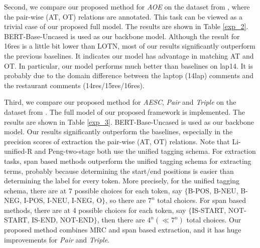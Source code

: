 \documentclass[letterpaper]{article} \usepackage{aaai21}  \usepackage{times}  \usepackage{helvet} \usepackage{courier}  \usepackage[hyphens]{url}  \usepackage{graphicx} \urlstyle{rm} \def\UrlFont{\rm}  \usepackage{natbib}  \usepackage{caption}
\begin{document}
Second, we compare our proposed method for \emph{AOE} on the dataset from \cite{fan2019target}, where the pair-wise (AT, OT) relations are annotated. 
This task can be viewed as a trivial case of our proposed full model. The results are shown in Table \ref{exp_2}. 
BERT-Base-Uncased is used as our backbone model. 
Although  the result for 16res is a little bit lower than LOTN, most of our results significantly outperform the previous baselines. 
It indicates our model has advantage in matching AT and OT. In particular, our model performs much better than baselines on lap14. It is probably due to 
the domain difference between the laptop (14lap) comments and the restaurant comments (14res/15res/16res). 

Third, we compare our proposed method for \emph{AESC}, \emph{Pair} and \emph{Triple} on the dataset from \cite{peng2020knowing}. 
The full model of our proposed framework is implemented.  The results are shown in Table \ref{exp_3}. 
BERT-Base-Uncased is used as our backbone model. 
Our results significantly outperform the baselines, especially in the precision scores of extraction the pair-wise (AT, OT) relations. 
Note that Li-unified-R and Peng-two-stage both use the unified tagging schema. For extraction tasks, span based methods outperform the unified tagging schema for extracting terms, probably because determining the start/end positions is easier than determining the label for every token. 
More precisely, for the unified tagging schema, there are at 7 possible choices for each token, say $\{$B-POS, B-NEU, B-NEG, I-POS, I-NEU, I-NEG, O$\}$, so there are $7^n$ total choices. 
For span based methods, there are at 4 possible choices for each token, say $\{$IS-START, NOT-START, IS-END, NOT-END$\}$, then there are $4^n (\ll 7^n)$ total choices. 
Our proposed method combines MRC and span based extraction, and it has huge improvements for \emph{Pair} and \emph{Triple}. 
\end{document}
